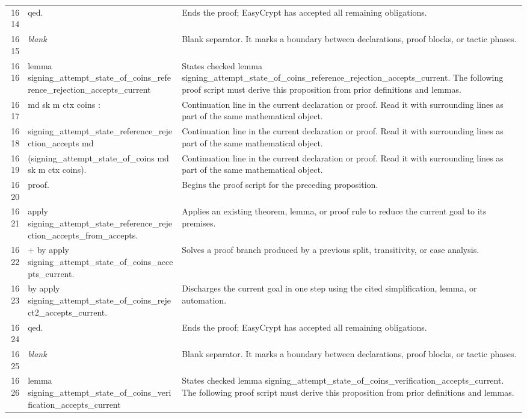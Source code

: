 \documentclass[10pt]{article}
\begin{document}
\begin{longtable}{r L{0.53\textwidth} L{0.37\textwidth}}
1614 & {\ttfamily\scriptsize qed.} & Ends the proof; EasyCrypt has accepted all remaining obligations. \\
1615 & {\ttfamily\scriptsize \emph{blank}} & Blank separator.  It marks a boundary between declarations, proof blocks, or tactic phases. \\
1616 & {\ttfamily\scriptsize lemma signing\_attempt\_state\_of\_coins\_reference\_rejection\_accepts\_current} & States checked lemma signing\_attempt\_state\_of\_coins\_reference\_rejection\_accepts\_current.  The following proof script must derive this proposition from prior definitions and lemmas. \\
1617 & {\ttfamily\scriptsize    md sk m ctx coins :} & Continuation line in the current declaration or proof.  Read it with surrounding lines as part of the same mathematical object. \\
1618 & {\ttfamily\scriptsize   signing\_attempt\_state\_reference\_rejection\_accepts md} & Continuation line in the current declaration or proof.  Read it with surrounding lines as part of the same mathematical object. \\
1619 & {\ttfamily\scriptsize     (signing\_attempt\_state\_of\_coins md sk m ctx coins).} & Continuation line in the current declaration or proof.  Read it with surrounding lines as part of the same mathematical object. \\
1620 & {\ttfamily\scriptsize proof.} & Begins the proof script for the preceding proposition. \\
1621 & {\ttfamily\scriptsize apply signing\_attempt\_state\_reference\_rejection\_accepts\_from\_accepts.} & Applies an existing theorem, lemma, or proof rule to reduce the current goal to its premises. \\
1622 & {\ttfamily\scriptsize + by apply signing\_attempt\_state\_of\_coins\_accepts\_current.} & Solves a proof branch produced by a previous split, transitivity, or case analysis. \\
1623 & {\ttfamily\scriptsize by apply signing\_attempt\_state\_of\_coins\_reject2\_accepts\_current.} & Discharges the current goal in one step using the cited simplification, lemma, or automation. \\
1624 & {\ttfamily\scriptsize qed.} & Ends the proof; EasyCrypt has accepted all remaining obligations. \\
1625 & {\ttfamily\scriptsize \emph{blank}} & Blank separator.  It marks a boundary between declarations, proof blocks, or tactic phases. \\
1626 & {\ttfamily\scriptsize lemma signing\_attempt\_state\_of\_coins\_verification\_accepts\_current} & States checked lemma signing\_attempt\_state\_of\_coins\_verification\_accepts\_current.  The following proof script must derive this proposition from prior definitions and lemmas. \\

\end{longtable}
\end{document}
